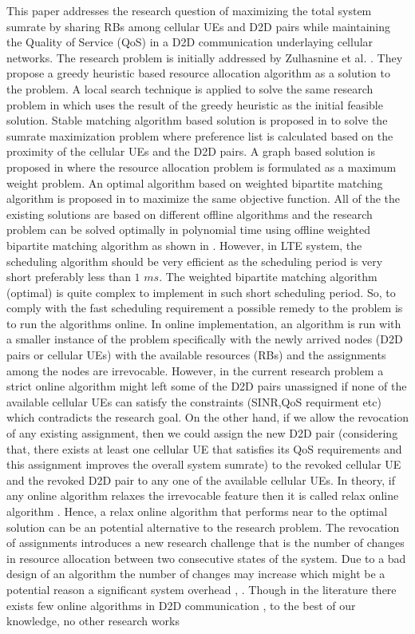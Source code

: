 \documentclass[times]{dacauth}
\begin{document}
\smallskip
\noindent 
This paper addresses the research question of maximizing the total system sumrate by sharing RBs among cellular UEs and D2D  pairs while maintaining the Quality of Service (QoS) in a D2D communication underlaying cellular networks. The research problem is initially addressed by Zulhasnine et al. \cite{zulhasnine}. They propose a greedy heuristic based resource allocation algorithm as a solution to the problem. A local search technique is applied to solve the same research problem in \cite{lora} which uses the result of the greedy heuristic \cite{zulhasnine} as the initial feasible solution. Stable matching algorithm \cite{kleinberg2011algorithm} based solution is proposed in \cite{dara} to solve the sumrate maximization problem where preference list is calculated based on the proximity of the cellular UEs and the D2D pairs. A graph based solution is proposed in \cite{zhang} where the resource allocation problem is formulated as a maximum weight problem. An optimal algorithm based on weighted bipartite matching algorithm is proposed in \cite{ccnc} to maximize the same objective function. All of the the existing solutions are based on different offline algorithms and the research problem can be solved optimally in polynomial time using offline weighted bipartite matching algorithm as shown in \cite{ccnc}. However, in LTE system, the scheduling algorithm should be very efficient as the scheduling period is very short preferably less than $1$  $ms$. The weighted bipartite matching algorithm (optimal) is quite complex to implement in such short scheduling period. So, to comply with the fast scheduling requirement a possible remedy to the problem is to run the algorithms online. In online implementation, an algorithm is run with a smaller instance of the problem specifically with the newly arrived nodes (D2D pairs or cellular UEs) with the available resources (RBs) and  the assignments among the nodes are irrevocable. However, in the current research problem a strict online algorithm  might left some of the D2D pairs unassigned if none of the available cellular UEs can satisfy the constraints (SINR,QoS requirment etc) which contradicts the research goal. On the other hand, if we allow the revocation of any existing assignment, then we could assign the new D2D pair (considering that, there exists at least one cellular UE that satisfies its QoS requirements and this assignment improves the overall system sumrate) to the revoked cellular UE and the revoked D2D pair to any one of the available cellular UEs. In theory, if any online algorithm relaxes the irrevocable feature then it is called relax online algorithm \cite {relax}. Hence, a relax online algorithm that performs near to the optimal solution can be an potential alternative to the research problem. The revocation of assignments introduces a new research challenge that is the number of changes in resource allocation between two consecutive states of the system. Due to a bad design of an algorithm the number of changes may increase which might be a potential reason a significant system overhead \cite{asadi2014survey}, \cite{seidel20133gpp}. Though in the literature there exists few online algorithms in D2D communication \cite{onlined2d, xu2014dynamic}, to the best of our knowledge, no other research works 
\end{document}
